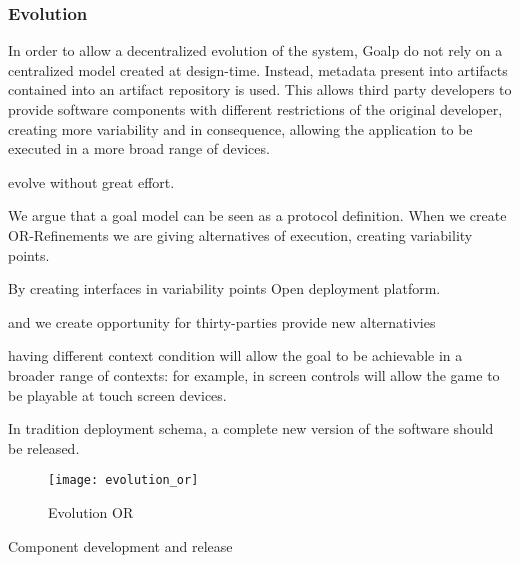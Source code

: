\subsubsection{Evolution}
In order to allow a decentralized evolution of the system, Goalp do not rely on a centralized model created at design-time. Instead, metadata present into artifacts contained into an artifact repository is used. This allows third party developers to provide software components with different restrictions of the original developer, creating more variability and in consequence, allowing the application to be executed in a more broad range of devices.

evolve without great effort.

We argue that a goal model can be seen as a protocol definition. When we create OR-Refinements we are giving alternatives of execution, creating variability points.

By creating interfaces in variability points
Open deployment platform.

  and we create opportunity for thirty-parties provide new alternativies

having different context condition will allow the goal to be achievable in a broader range of contexts: for example, in screen controls will allow the game to be playable at touch screen devices.

In tradition deployment schema, a complete new version of the software should be released.

\begin{figure}[!htb]
  \centering
  \texttt{[image: evolution\_or]}
  \caption{Evolution OR}
\label{fig:evolution_or}
\end{figure}

Component development and release
